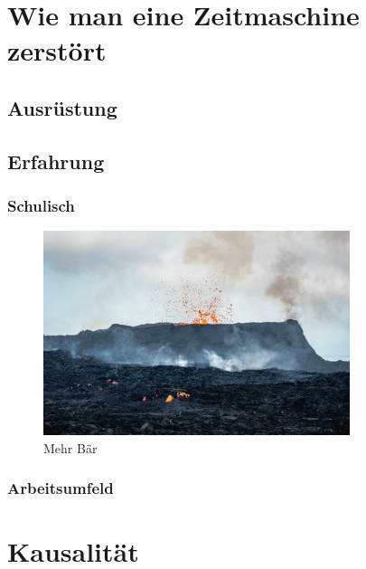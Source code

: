\documentclass[
a5paper,
10pt, 
onecolumn,
openany,
]{memoir}
\begin{document}
\lipsum[1-4]

\chapter{Wie man eine Zeitmaschine zerstört}

\lipsum[1-3]

\section{Ausrüstung}

\lipsum[1-1]

\section{Erfahrung}

\lipsum[1-1]

\subsection{Schulisch}

\begin{figure}
  \centering
  \includegraphics[width=0.8\textwidth]{fotos/d}
  \caption{Mehr Bär}
\end{figure}

\lipsum[1-5]

\subsection{Arbeitsumfeld}

\lipsum[1-2]

\clearpage

\thispagestyle{empty}
\listoffigures
\clearpage

\thispagestyle{empty}
\listoftables
\clearpage

\appendix

\chapter{Kausalität}

\lipsum[1-2]

\backmatter
\end{document}
